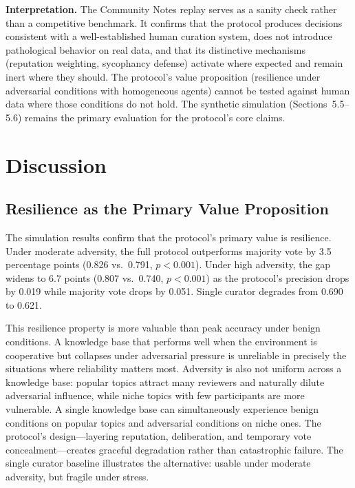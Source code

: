 \documentclass[11pt]{article}
\begin{document}
\textbf{Interpretation.} The Community Notes replay serves as a sanity check rather than a competitive benchmark. It confirms that the protocol produces decisions consistent with a well-established human curation system, does not introduce pathological behavior on real data, and that its distinctive mechanisms (reputation weighting, sycophancy defense) activate where expected and remain inert where they should. The protocol's value proposition (resilience under adversarial conditions with homogeneous agents) cannot be tested against human data where those conditions do not hold. The synthetic simulation (Sections~5.5--5.6) remains the primary evaluation for the protocol's core claims.

\section{Discussion}

\subsection{Resilience as the Primary Value Proposition}

The simulation results confirm that the protocol's primary value is resilience. Under moderate adversity, the full protocol outperforms majority vote by 3.5 percentage points (0.826 vs.\ 0.791, $p < 0.001$). Under high adversity, the gap widens to 6.7 points (0.807 vs.\ 0.740, $p < 0.001$) as the protocol's precision drops by 0.019 while majority vote drops by 0.051. Single curator degrades from 0.690 to 0.621.

This resilience property is more valuable than peak accuracy under benign conditions. A knowledge base that performs well when the environment is cooperative but collapses under adversarial pressure is unreliable in precisely the situations where reliability matters most. Adversity is also not uniform across a knowledge base: popular topics attract many reviewers and naturally dilute adversarial influence, while niche topics with few participants are more vulnerable. A single knowledge base can simultaneously experience benign conditions on popular topics and adversarial conditions on niche ones. The protocol's design---layering reputation, deliberation, and temporary vote concealment---creates graceful degradation rather than catastrophic failure. The single curator baseline illustrates the alternative: usable under moderate adversity, but fragile under stress.
\end{document}
